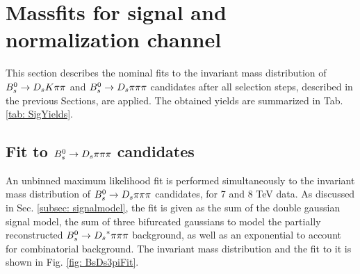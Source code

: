 \section{Massfits for signal and normalization channel}
\label{sec: fitting}

This section describes the nominal fits to the invariant mass distribution of ${{B}^0_{s}}\rightarrow{\ensuremath{{D}_{s}}}{\ensuremath{K}}{\ensuremath{\pi}}{\ensuremath{\pi}}$ and ${{B}^0_{s}}\rightarrow{\ensuremath{{D}_{s}}}{\ensuremath{\pi}}{\ensuremath{\pi}}{\ensuremath{\pi}}$ candidates after all selection steps, described in the previous Sections, are applied. 
The obtained yields are summarized in Tab. \ref{tab: SigYields}.

\subsection{Fit to ${{B}^0_{s}}\rightarrow{\ensuremath{{D}_{s}}}{\ensuremath{\pi}}{\ensuremath{\pi}}{\ensuremath{\pi}}$ candidates}
\label{subsec: NormFit}

An unbinned maximum likelihood fit is performed simultaneously to the invariant mass distribution of ${{B}^0_{s}}\rightarrow{\ensuremath{{D}_{s}}}{\ensuremath{\pi}}{\ensuremath{\pi}}{\ensuremath{\pi}}$ candidates, for 7 and 8 TeV data. 
As discussed in Sec. \ref{subsec: signalmodel}, the fit is given as the sum of the double gaussian signal model, the sum of three bifurcated gaussians to model the partially reconstructed ${{B}^0_{s}}\rightarrow{\ensuremath{{D}_{s}}}^{*}{\pi}{\pi}{\pi}$ background, as well as an exponential to account for combinatorial background. The invariant mass distribution and the fit to it is shown in Fig. \ref{fig: BsDs3piFit}.

